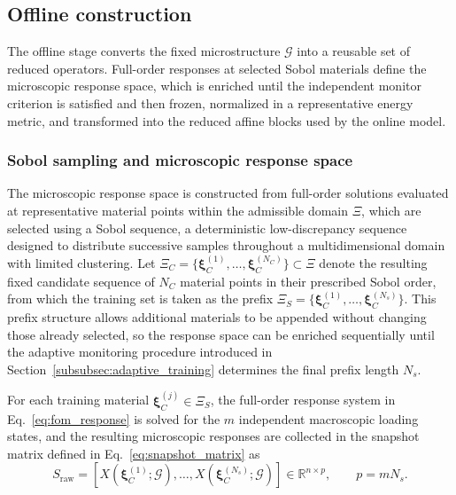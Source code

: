 \documentclass[pdflatex,sn-basic,Numbered]{sn-jnl}
\newcommand{\R}{\mathbb{R}}
\newcommand{\G}{\mathcal{G}}
\begin{document}
\subsection{Offline construction}
\label{subsec:offline}

The offline stage converts the fixed microstructure \(\G\) into a reusable
set of reduced operators. Full-order responses at selected Sobol materials
define the microscopic response space, which is enriched until the independent
monitor criterion is satisfied and then frozen, normalized in a representative
energy metric, and transformed into the reduced affine blocks used by the
online model.

\subsubsection{Sobol sampling and microscopic response space}
\label{subsubsec:sobol_space}

The microscopic response space is constructed from full-order solutions
evaluated at representative material points within the admissible domain
\(\Xi\), which are selected using a Sobol sequence, a deterministic
low-discrepancy sequence designed to distribute successive samples throughout
a multidimensional domain with limited clustering. Let
\(\Xi_C=\{\boldsymbol\xi_C^{(1)},\ldots,
\boldsymbol\xi_C^{(N_C)}\}\subset\Xi\) denote the resulting fixed candidate
sequence of \(N_C\) material points in their prescribed Sobol order, from
which the training set is taken as the prefix
\(\Xi_S=\{\boldsymbol\xi_C^{(1)},\ldots,
\boldsymbol\xi_C^{(N_s)}\}\). This prefix structure allows additional
materials to be appended without changing those already selected, so the
response space can be enriched sequentially until the adaptive monitoring
procedure introduced in Section~\ref{subsubsec:adaptive_training} determines
the final prefix length \(N_s\).

For each training material
\(\boldsymbol\xi_C^{(j)}\in\Xi_S\), the full-order response system in
Eq.~\eqref{eq:fom_response} is solved for the \(m\) independent macroscopic
loading states, and the resulting microscopic responses are collected in the
snapshot matrix defined in Eq.~\eqref{eq:snapshot_matrix} as
\begin{equation}
\label{eq:snapshot_matrix}
S_{\mathrm{raw}}
=
\left[
X(\boldsymbol\xi_C^{(1)};\G),\ldots,
X(\boldsymbol\xi_C^{(N_s)};\G)
\right]
\in\R^{n\times p},
\qquad
p=mN_s.
\end{equation}
\end{document}
